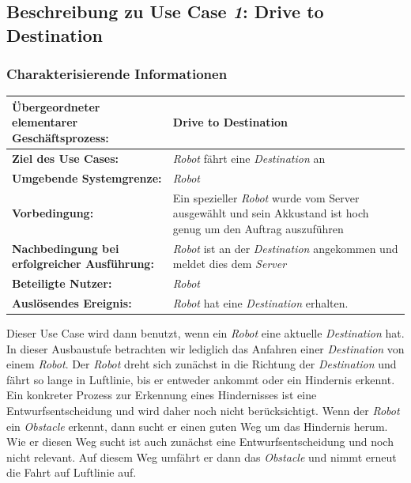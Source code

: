 \documentclass[includeheaders]{scrartcl}
\begin{document}
		\subsection{Beschreibung zu Use Case \emph{1}: Drive to Destination}

			\subsubsection*{Charakterisierende Informationen}

			\begin{table}[H]
				\centering
				\begin{tabularx}{\textwidth}{@{}p{5cm}X@{}}
				\toprule
				\textbf{Übergeordneter elementarer Geschäftsprozess:} & Drive to Destination\\ \midrule
				\textbf{Ziel des Use Cases:} & \emph{Robot} fährt eine \emph{Destination} an\\ \midrule
				\textbf{Umgebende Systemgrenze:} & \emph{Robot} \\ \midrule
				\textbf{Vorbedingung:} & Ein spezieller \emph{Robot} wurde vom Server ausgewählt und sein Akkustand ist hoch genug um den Auftrag auszuführen \\ \midrule
				\textbf{Nachbedingung bei erfolgreicher Ausführung:} & \emph{Robot} ist an der \emph{Destination} angekommen und meldet dies dem \emph{Server} \\ \midrule
				\textbf{Beteiligte Nutzer:} & \emph{Robot} \\ \midrule
				\textbf{Auslösendes Ereignis:} & \emph{Robot} hat eine \emph{Destination} erhalten. \\
				\bottomrule
				\end{tabularx}
			\end{table}

			Dieser Use Case wird dann benutzt, wenn ein \emph{Robot} eine aktuelle
			\emph{Destination} hat. In dieser Ausbaustufe betrachten wir lediglich das Anfahren
			einer \emph{Destination} von einem \emph{Robot}. Der \emph{Robot} dreht sich zunächst in die
			Richtung der \emph{Destination} und fährt so lange in Luftlinie, bis er entweder
			ankommt oder ein Hindernis erkennt. Ein konkreter Prozess zur Erkennung
			eines Hindernisses ist eine Entwurfsentscheidung und wird daher noch
			nicht berücksichtigt. Wenn der \emph{Robot} ein \emph{Obstacle} erkennt, dann
			sucht er einen guten Weg um das Hindernis herum. Wie er diesen Weg sucht
			ist auch zunächst eine Entwurfsentscheidung und noch nicht relevant. Auf
			diesem Weg umfährt er dann das \emph{Obstacle} und nimmt erneut die Fahrt auf
			Luftlinie auf.
\end{document}
